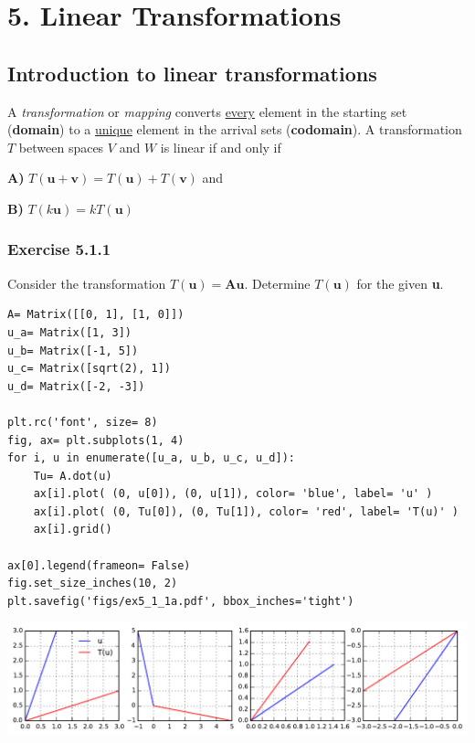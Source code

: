 \section{5. Linear Transformations}

\subsection{Introduction to linear transformations}

A \emph{transformation} or \emph{mapping} converts \underline{every} element in
the starting set (\textbf{domain}) to a \underline{unique} element in the arrival
sets (\textbf{codomain}). A transformation $T$ between spaces $V$ and $W$ is linear 
if and only if

\textbf{A)} $T(\mathbf{u} + \mathbf{v}) = T(\mathbf{u}) + T(\mathbf{v})$ and

\textbf{B)} $T(k\mathbf{u}) = kT(\mathbf{u})$

\subsubsection{Exercise 5.1.1}

Consider the transformation $T(\mathbf{u}) = \mathbf{Au}$. Determine $T(\mathbf{u})$
for the given \textbf{u}.

\begin{verbatim}
A= Matrix([[0, 1], [1, 0]])
u_a= Matrix([1, 3])
u_b= Matrix([-1, 5])
u_c= Matrix([sqrt(2), 1])
u_d= Matrix([-2, -3])

plt.rc('font', size= 8)
fig, ax= plt.subplots(1, 4)
for i, u in enumerate([u_a, u_b, u_c, u_d]):
    Tu= A.dot(u)
    ax[i].plot( (0, u[0]), (0, u[1]), color= 'blue', label= 'u' )
    ax[i].plot( (0, Tu[0]), (0, Tu[1]), color= 'red', label= 'T(u)' )
    ax[i].grid()

ax[0].legend(frameon= False)    
fig.set_size_inches(10, 2)
plt.savefig('figs/ex5_1_1a.pdf', bbox_inches='tight')
\end{verbatim}

\includegraphics[width=1.2\linewidth]{figs/ex5_1_1a.pdf}

